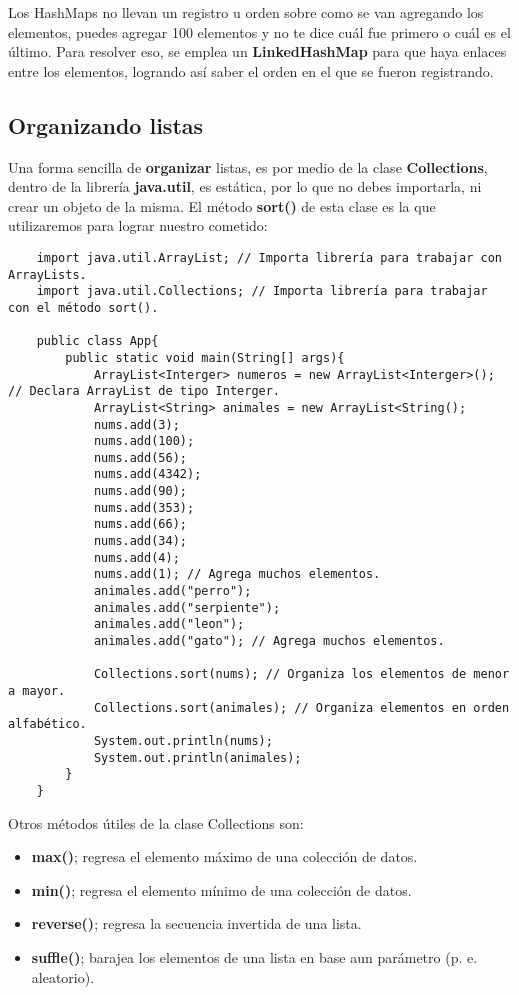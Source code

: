 Los HashMaps no llevan un registro u orden sobre como se van agregando los elementos, puedes agregar 100 elementos y no te dice cuál fue primero o cuál es el último. Para resolver eso, se emplea un \textbf{LinkedHashMap} para que haya enlaces entre los elementos, logrando así saber el orden en el que se fueron registrando.


\subsection{Organizando listas}

Una forma sencilla de \textbf{organizar} listas, es por medio de la clase \textbf{Collections}, dentro de la librería \textbf{java.util}, es estática, por lo que no debes importarla, ni crear un objeto de la misma. El método \textbf{sort()} de esta clase es la que utilizaremos para lograr nuestro cometido:
\begin{lstlisting}
    import java.util.ArrayList; // Importa librería para trabajar con ArrayLists.
    import java.util.Collections; // Importa librería para trabajar con el método sort().
    
    public class App{
        public static void main(String[] args){
            ArrayList<Interger> numeros = new ArrayList<Interger>(); // Declara ArrayList de tipo Interger.
            ArrayList<String> animales = new ArrayList<String();
            nums.add(3);
            nums.add(100);
            nums.add(56);
            nums.add(4342);
            nums.add(90);
            nums.add(353);
            nums.add(66);
            nums.add(34);
            nums.add(4);
            nums.add(1); // Agrega muchos elementos.
            animales.add("perro");
            animales.add("serpiente");
            animales.add("leon");
            animales.add("gato"); // Agrega muchos elementos.
            
            Collections.sort(nums); // Organiza los elementos de menor a mayor.
            Collections.sort(animales); // Organiza elementos en orden alfabético.
            System.out.println(nums);
            System.out.println(animales);
        }
    }
\end{lstlisting}

Otros métodos útiles de la clase Collections son:
\begin{itemize}
    \item \textbf{max()}; regresa el elemento máximo de una colección de datos.
    \item \textbf{min()}; regresa el elemento mínimo de una colección de datos.
    \item \textbf{reverse()}; regresa la secuencia invertida de una lista.
    \item \textbf{suffle()}; barajea los elementos de una lista en base aun parámetro (p. e. aleatorio).
\end{itemize}


